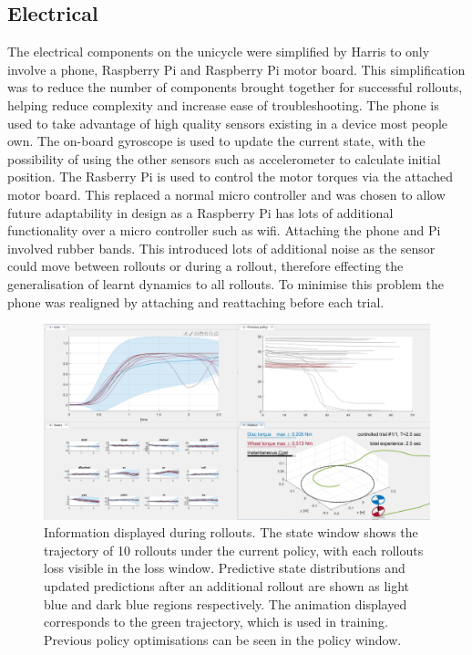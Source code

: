 \documentclass[twoside,twocolumn,12pt]{article}
\begin{document}
\subsection{Electrical}
The electrical components on the unicycle were simplified by Harris \cite{arsalan} to only involve a phone, Raspberry Pi and Raspberry Pi motor board. This simplification was to reduce the number of components brought together for successful rollouts, helping reduce complexity and increase ease of troubleshooting. 
\newline
The phone is used to take advantage of high quality sensors existing in a device most people own. The on-board gyroscope is used to update the current state, with the possibility of using the other sensors such as accelerometer to calculate initial position. 
\newline
The Rasberry Pi is used to control the motor torques via the attached motor board. This replaced a normal micro controller and was chosen to allow future adaptability in design as a Raspberry Pi has lots of additional functionality over a micro controller such as wifi.
\newline
Attaching the phone and Pi involved rubber bands. This introduced lots of additional noise as the sensor could move between rollouts or during a rollout, therefore effecting the generalisation of learnt dynamics to all rollouts. To minimise this problem the phone was realigned by attaching and reattaching before each trial. 
\begin{figure}[t!]
  \centering
    \includegraphics[width=\linewidth]{pilco}
   \caption{Information displayed during rollouts. The state window shows the trajectory of 10 rollouts under the current policy, with each rollouts loss visible in the loss window. Predictive state distributions and updated predictions after an additional rollout are shown as light blue and dark blue regions respectively. The animation displayed corresponds to the green trajectory, which is used in training. Previous policy optimisations can be seen in the policy window.}
  \label{fig:pilcoscreen}
\end{figure}
\end{document}

